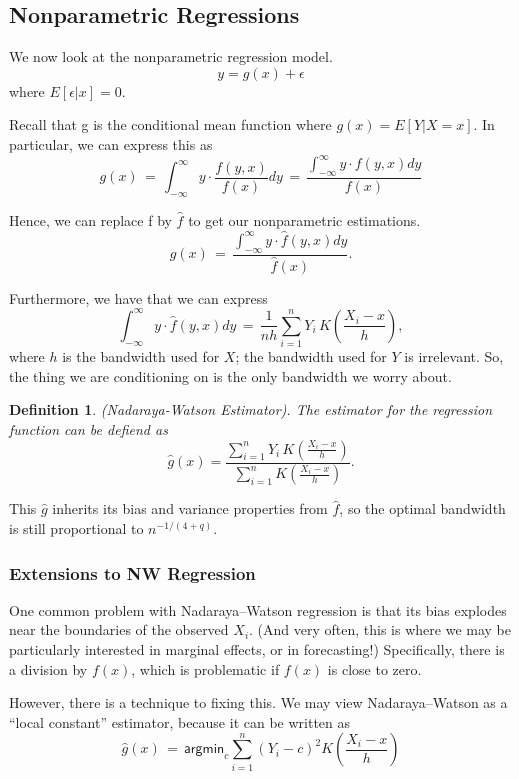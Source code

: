 \documentclass[twoside]{article}
\newtheorem{definition}[theorem]{Definition}
\begin{document}
\subsection{Nonparametric Regressions}

We now look at the nonparametric regression model. 
$$
y = g(x) + \epsilon
$$
where $E[\epsilon|x] = 0$. 

Recall that g is the conditional mean function where $g(x) = E[Y|X=x]$. In particular, we can express this as
\[g\left(x\right)\,=\,\int_{-\infty}^\infty y\cdot\frac{f\left(y,x\right)}{f\left(x\right)}dy\,=\,\frac{\int_{-\infty}^\infty y\cdot f\left(y,x\right)dy}{f\left(x\right)}\]

Hence, we can replace f by $\hat{f}$ to get our nonparametric estimations.
\[g\left(x\right)\,=\,\frac{\int_{-\infty}^\infty y\cdot \hat{f}\left(y,x\right)dy}{\hat{f}\left(x\right)}.\]

Furthermore, we have that we can express \[\int_{-\infty}^\infty y\cdot\hat{f}\left(y,x\right)dy\,=\,\frac{1}{nh}\sum_{i=1}^nY_i\,K\left(\frac{X_i-x}{h}\right),\] where $h$ is the bandwidth used for $X$; the bandwidth used for $Y$ is irrelevant. So, the thing we are conditioning on is the only bandwidth we worry about. 

\begin{definition}(Nadaraya-Watson Estimator). The estimator for the regression function can be defiend as
$$\hat{g}\left(x\right)=\frac{\sum_{i=1}^nY_i\,K\left(\frac{X_i-x}{h}\right)}{\sum_{i=1}^nK\left(\frac{X_i-x}{h}\right)}.$$
\end{definition}

This $\hat{g}$ inherits its bias and variance properties from $\hat{f}$, so the optimal bandwidth is still proportional to $n^{-1/\left(4+q\right)}$.

\subsubsection{Extensions to NW Regression}

One common problem with Nadaraya--Watson regression is that its bias explodes near the boundaries of the observed $X_i$. (And very often, this is where we may be particularly interested in marginal effects, or in forecasting!) Specifically, there is a division by $f\left(x\right)$, which is problematic if $f\left(x\right)$ is close to zero.

However, there is a technique to fixing this. We may view Nadaraya--Watson as a ``local constant'' estimator, because it can be written as \[\hat{g}\left(x\right)\,=\,\textsf{argmin}_c\sum_{i=1}^n\left(Y_i-c\right)^2K\left(\frac{X_i-x}{h}\right)\]
\end{document}
